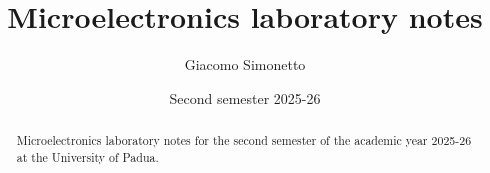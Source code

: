 \documentclass[a4paper]{article}
\title{Microelectronics laboratory notes}
\author{Giacomo Simonetto}
\date{Second semester 2025-26}
\begin{document}
\maketitle
\begin{abstract}
	Microelectronics laboratory notes for the second semester of the academic year 2025-26 at the University of Padua.
\end{abstract}

\newpage

\tableofcontents

\newpage









\end{document}

